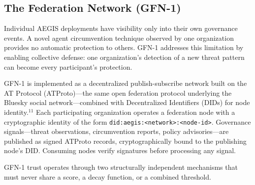 \documentclass{IEEEcsmag}
\begin{document}
\subsection{The Federation Network (GFN-1)}

Individual AEGIS deployments have visibility only into their own governance events. A novel agent circumvention technique observed by one organization provides no automatic protection to others. GFN-1 addresses this limitation by enabling collective defense: one organization's detection of a new threat pattern can become every participant's protection.

GFN-1 is implemented as a decentralized publish-subscribe network built on the AT Protocol (ATProto)---the same open federation protocol underlying the Bluesky social network---combined with Decentralized Identifiers (DIDs) for node identity.$^{11}$ Each participating organization operates a federation node with a cryptographic identity of the form \texttt{did:aegis:<network>:<node-id>}. Governance signals---threat observations, circumvention reports, policy advisories---are published as signed ATProto records, cryptographically bound to the publishing node's DID. Consuming nodes verify signatures before processing any signal. 

GFN-1 trust operates through two structurally independent mechanisms that must never share a score, a decay function, or a combined threshold. 
\end{document}
